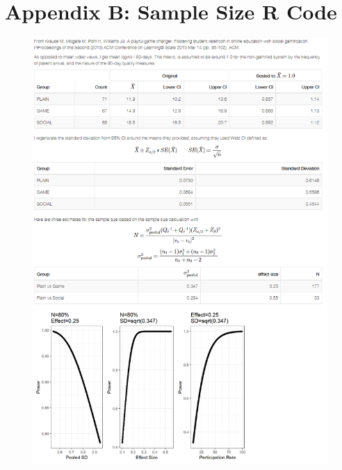 \documentclass[12pt]{memoir}
\begin{document}
\clearpage
\chapter{Appendix B: Sample Size R Code}
\begin{figure}[h]
    \centering
    \includegraphics[trim={25mm 10mm 10mm 0mm}, height=0.85\textheight]{img/sample-size.png}
\end{figure}
\end{document}
